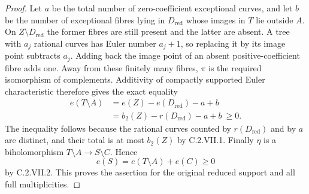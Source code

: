\begin{proof}
Let $a$ be the total number of zero-coefficient
exceptional curves, and let $b$ be the number of
exceptional fibres lying in $D_{\mathrm{red}}$
whose images in $T$ lie outside $A$. On
$Z\setminus D_{\mathrm{red}}$ the former fibres
are still present and the latter are absent.
A tree with $a_j$ rational curves has Euler
number $a_j+1$, so replacing it by its image
point subtracts $a_j$. Adding back the image
point of an absent positive-coefficient fibre
adds one. Away from these finitely many fibres,
$\pi$ is the required isomorphism of complements.
Additivity of compactly supported Euler
characteristic therefore gives the exact equality
\[
 \begin{aligned}
 e(T\setminus A)
   &=e(Z)-e(D_{\mathrm{red}})-a+b\\
   &=b_2(Z)-r(D_{\mathrm{red}})-a+b
   \ \ge0 .
 \end{aligned}
\tag{C.VII.8}
\]
The inequality follows because the rational curves
counted by $r(D_{\mathrm{red}})$ and by $a$ are
distinct, and their total is at most $b_2(Z)$ by
C.2.VII.1.
Finally $\eta$ is a biholomorphism
$T\setminus A\to S\setminus C$. Hence
\[
 e(S)=e(T\setminus A)+e(C)\ge0
\]
by C.2.VII.2. This proves the assertion for the
original reduced support and all full multiplicities.
\end{proof}

